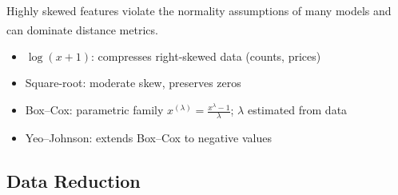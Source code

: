 \begin{tcbitemize}[ skin=sectionraster ]
    \tcbitem[title=Log and Power Transforms, raster multicolumn=3]
    Highly skewed features violate the normality assumptions of many models and can dominate distance metrics\textsuperscript{\cite{hanDataMiningConcepts2012}}.
    \tcblower
    \begin{itemize}
        \item $\log(x + 1)$: compresses right-skewed data (counts, prices)
        \item Square-root: moderate skew, preserves zeros
        \item Box--Cox: parametric family $x^{(\lambda)} = \frac{x^\lambda - 1}{\lambda}$; $\lambda$ estimated from data
        \item Yeo--Johnson: extends Box--Cox to negative values
    \end{itemize}
\end{tcbitemize}

\subsection{Data Reduction}


